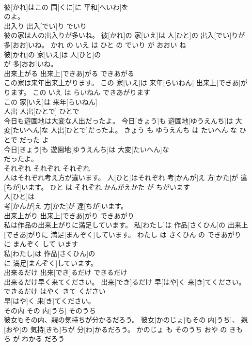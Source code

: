 \documentclass[8pt]{extreport}
\begin{document}
\begin{CJK}{UTF8}{min}
\\	彼[かれ]はこの 国[くに]に 平和[へいわ]を
\\	のよ。			
\\	出入り	出入[でい]り	でいり	
\\	彼の家は人の出入りが多いね。	彼[かれ]の 家[いえ]は 人[ひと]の 出入[でい]りが 多[おお]いね。	かれ の いえ は ひと の でいり が おおい ね	
\\	彼[かれ]の 家[いえ]は 人[ひと]の
\\	が 多[おお]いね。			
\\	出来上がる	出来上[できあ]がる	できあがる	
\\	この家は来年出来上がります。	この 家[いえ]は 来年[らいねん] 出来上[できあ]がります。	この いえ は らいねん できあがります	
\\	この 家[いえ]は 来年[らいねん]
\\	人出	人出[ひとで]	ひとで	
\\	今日も遊園地は大変な人出だったよ。	今日[きょう]も 遊園地[ゆうえんち]は 大変[たいへん]な 人出[ひとで]だったよ。	きょう も ゆうえんち は たいへん な ひとで だった よ	
\\	今日[きょう]も 遊園地[ゆうえんち]は 大変[たいへん]な
\\	だったよ。			
\\	それぞれ	それぞれ	それぞれ	
\\	人はそれぞれ考え方が違います。	人[ひと]はそれぞれ 考[かんが]え 方[かた]が 違[ちが]います。	ひと は それぞれ かんがえかた が ちがいます	
\\	人[ひと]は
\\	考[かんが]え 方[かた]が 違[ちが]います。			
\\	出来上がり	出来上[できあ]がり	できあがり	
\\	私は作品の出来上がりに満足しています。	私[わたし]は 作品[さくひん]の 出来上[できあ]がりに 満足[まんぞく]しています。	わたし は さくひん の できあがり に まんぞく して います	
\\	私[わたし]は 作品[さくひん]の
\\	に 満足[まんぞく]しています。			
\\	出来るだけ	出来[でき]るだけ	できるだけ	
\\	出来るだけ早く来てください。	出来[でき]るだけ 早[はや]く 来[き]てください。	できるだけ はやく きて ください	
\\	早[はや]く 来[き]てください。			
\\	その内	その 内[うち]	そのうち	
\\	彼女もその内、親の気持ちが分かるだろう。	彼女[かのじょ]もその 内[うち]、 親[おや]の 気持[きも]ちが 分[わ]かるだろう。	かのじょ も そのうち おや の きもち が わかる だろう	

\end{CJK}
\end{document}
